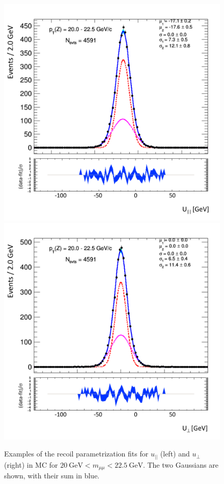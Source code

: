 \begin{figure}
\centering
\includegraphics[width=0.49\linewidth]{plots/Recoil/example-mc-pfu1fit_12.pdf}
\includegraphics[width=0.49\linewidth]{plots/Recoil/example-mc-pfu2fit_12.pdf}
\caption{Examples of the recoil parametrization fits for $u_{||}$ (left) and $u_{\perp}$ (right) in MC for $20~\mathrm{GeV} < m_{\mu\mu}  < 22.5~\mathrm{GeV}$. The two Gaussians are shown, with their sum in blue.}
\label{fig:recoil:mc_fit_example}
\end{figure}